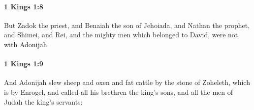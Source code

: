 		\paragraph{1 Kings 1:8} %
			\label{1KINGS-1-8}

			But Zadok the priest, and Benaiah the son of Jehoiada, and Nathan the prophet, and Shimei, and Rei, and the mighty men which belonged to David, were not with Adonijah.


		\paragraph{1 Kings 1:9} %
			\label{1KINGS-1-9}

			And Adonijah slew sheep and oxen and fat cattle by the stone of Zoheleth, which is by Enrogel, and called all his brethren the king’s sons, and all the men of Judah the king’s servants:


